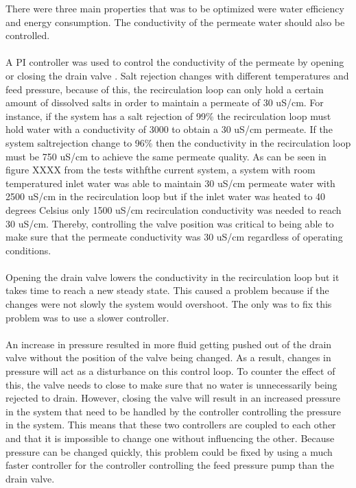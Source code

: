 There were three main properties that was to be optimized were water efficiency and energy consumption. The conductivity of the permeate water should also be controlled.\\
\\
A PI controller was used to control the conductivity of the permeate by opening or closing the drain valve . Salt rejection changes with different temperatures and feed pressure, because of this, the recirculation loop can only hold a certain amount of dissolved salts in order to maintain a permeate of 30 uS/cm. For instance, if the system has a salt rejection of 99\% the recirculation loop must hold water with a conductivity of 3000 to obtain a 30 uS/cm permeate. If the system saltrejection change to 96\% then the conductivity in the recirculation loop must be 750 uS/cm to achieve the same permeate quality. As can be seen in figure XXXX from the tests withfthe current system, a system with room temperatured inlet water was able to maintain 30 uS/cm permeate water with 2500 uS/cm in the recirculation loop but if the inlet water was heated to 40 degrees Celsius only 1500 uS/cm recirculation conductivity was needed to reach 30 uS/cm. Thereby, controlling the valve position was critical to being able to make sure that the permeate conductivity was 30 uS/cm regardless of operating conditions. \\
\\
Opening the drain valve lowers the conductivity in the recirculation loop but it takes time to reach a new steady state. This caused a problem because if the changes were not slowly the system would overshoot. The only was to fix this problem was to use a slower controller.\\
\\
An increase in pressure resulted in more fluid getting pushed out of the drain valve without the position of the valve being changed. As a result, changes in pressure will act as a disturbance on this control loop. To counter the effect of this, the valve needs to close to make sure that no water is unnecessarily being rejected to drain. However, closing the valve will result in an increased pressure in the system that need to be handled by the controller controlling the pressure in the system. This means that these two controllers are coupled to each other and that it is impossible to change one without influencing the other. Because pressure can be changed quickly, this problem could be fixed by using a much faster controller for the controller controlling the feed pressure pump than the drain valve.\\
